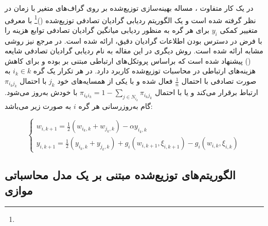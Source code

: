  در یک کار متفاوت \cite{Pu2021}، مساله بهینه‌سازی توزیع‌شده بر روی گراف‌های متغیر با زمان در نظر گرفته‌ شده است و یک الگوریتم ردیابی گرادیان تصادفی توزیع‌شده ()\footnote{}  با معرفی متغییر کمکی $y_i$  برای هر گره به منظور ردیابی میانگین گرادیان تصادفی توابع هزینه را با فرض در دسترس بودن اطلاعات گرادیان دقیق، ارائه شده‌ است. در مرجع \cite{time2017} نیز روشی مشابه ارائه شده است. روش دیگری در این مقاله  \cite{Pu2021} به نام ردیابی گرادیان تصادفی شایعه ()  پیشنهاد شده است که براساس پروتکل‌های ارتباطی مبتنی بر  بوده و برای کاهش هزینه‌های ارتباطی در محاسبات توزیع‌شده کاربرد دارد. در هر تکرار یک گره‌ $i_k\in k$ به صورت تصادفی با احتمال $\frac{1}{n}$ فعال شده و با یکی از همسایه‌های خود $j_k$ با احتمال $\pi_{i_k j_k}$ ارتباط برقرار می‌کند و یا با احتمال $\pi_{i_k i_k}=1-\sum_{j\in N_{i_k}}\pi_{i_k j_k}$  با خودش به‌روز می‌شود. گام به‌روزرسانی هر گره $i$ به صورت زیر می‌باشد:
 
 \begin{equation}\label{e27}
 	\begin{cases}
 		w_{i,k+1}=\frac{1}{2}(w_{i_k,k}+w_{j_k,k})-\alpha y_{i_k,k}\\
 		y_{i,k+1}=\frac{1}{2}(y_{i_k,k}+y_{j_k,k})+g_i(w_{i,k+1},\xi_{i,k+1})-g_i(w_{i,k},\xi_{i,k})
 	\end{cases}
 \end{equation}
 
 
\subsection{الگوریتم‌های توزیع‌شده مبتنی بر یک مدل محاسباتی موازی}

